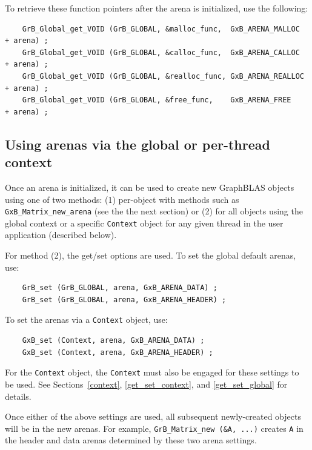 To retrieve these function pointers after the arena is initialized, use the following:

    {\footnotesize
    \begin{verbatim}
    GrB_Global_get_VOID (GrB_GLOBAL, &malloc_func,  GxB_ARENA_MALLOC  + arena) ;
    GrB_Global_get_VOID (GrB_GLOBAL, &calloc_func,  GxB_ARENA_CALLOC  + arena) ;
    GrB_Global_get_VOID (GrB_GLOBAL, &realloc_func, GxB_ARENA_REALLOC + arena) ;
    GrB_Global_get_VOID (GrB_GLOBAL, &free_func,    GxB_ARENA_FREE    + arena) ; \end{verbatim}}

\subsection{Using arenas via the global or per-thread context}
\label{arena_global}

Once an arena is initialized, it can be used to create new GraphBLAS objects
using one of two methods:  (1) per-object with methods such as
\verb'GxB_Matrix_new_arena' (see the the next section) or (2) for all objects
using the global context or a specific \verb'Context' object for any given
thread in the user application (described below). 

For method (2), the get/set options are used.  To set the global default
arenas, use:

    {\footnotesize
    \begin{verbatim}
    GrB_set (GrB_GLOBAL, arena, GxB_ARENA_DATA) ;
    GrB_set (GrB_GLOBAL, arena, GxB_ARENA_HEADER) ; \end{verbatim}}

To set the arenas via a \verb'Context' object, use:

    {\footnotesize
    \begin{verbatim}
    GxB_set (Context, arena, GxB_ARENA_DATA) ;
    GxB_set (Context, arena, GxB_ARENA_HEADER) ; \end{verbatim}}

For the \verb'Context' object, the \verb'Context' must also be engaged for
these settings to be used.  See Sections~\ref{context}, \ref{get_set_context},
and \ref{get_set_global} for details.

Once either of the above settings are used, all subsequent newly-created
objects will be in the new arenas.  For example,
\verb'GrB_Matrix_new (&A, ...)' creates \verb'A' in the header and
data arenas determined by these two arena settings.

